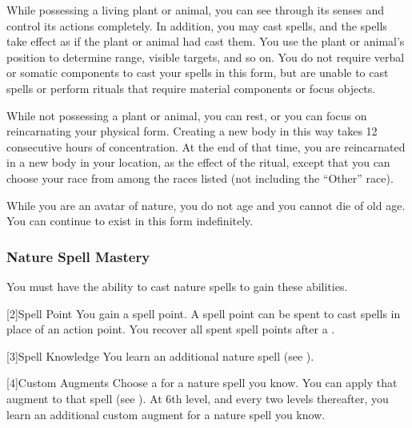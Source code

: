             While possessing a living plant or animal, you can see through its senses and control its actions completely.
            In addition, you may cast spells, and the spells take effect as if the plant or animal had cast them.
            You use the plant or animal's position to determine range, visible targets, and so on.
            You do not require verbal or somatic components to cast your spells in this form, but are unable to cast spells or perform rituals that require material components or focus objects.

            While not possessing a plant or animal, you can rest, or you can focus on reincarnating your physical form.
            Creating a new body in this way takes 12 consecutive hours of concentration.
            At the end of that time, you are reincarnated in a new body in your location, as the effect of the  ritual, except that you can choose your race from among the races listed (not including the ``Other'' race).

            While you are an avatar of nature, you do not age and you cannot die of old age.
            You can continue to exist in this form indefinitely.

        \subsubsection{Nature Spell Mastery}
            You must have the ability to cast nature spells to gain these abilities.

            [2]{Spell Point}
            You gain a spell point.
            A spell point can be spent to cast spells in place of an action point.
            You recover all spent spell points after a .

            [3]{Spell Knowledge} 
            You learn an additional nature spell (see ).

            [4]{Custom Augments}
            Choose a  for a nature spell you know.
            You can apply that augment to that spell (see ).
            At 6th level, and every two levels thereafter, you learn an additional custom augment for a nature spell you know.

